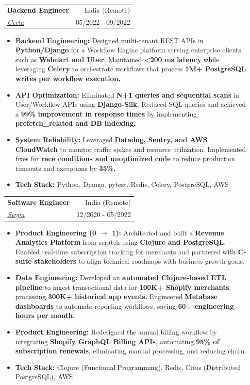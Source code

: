 \documentclass[letterpaper,11pt]{article}
\makeatletter
\newcommand{\resumeItem}[1]{
  \item\small{
    {#1 \vspace{-1pt}}
  }
}
\newcommand{\resumeSubheading}[4]{
  \vspace{-1pt}\item
    \begin{tabular*}{\textwidth}[t]{l@{\extracolsep{\fill}}r}
      \textbf{#1} & {\color{dark-grey}\small #2}\vspace{1pt}\\ %
      \textit{#3} & {\color{dark-grey} \small #4}\\ %
    \end{tabular*}\vspace{-4pt}
}
\newcommand{\resumeItemListStart}{\begin{itemize}}
\newcommand{\resumeItemListEnd}{\end{itemize}\vspace{0pt}}
\makeatother
\begin{document}
    \resumeSubheading
      {Backend Engineer}{India (Remote)}
      {\href{https://www.certa.ai/}{Certa}}{05/2022 - 09/2022}
      \resumeItemListStart
        \resumeItem{\textbf{Backend Engineering:} Designed multi-tenant REST APIs in \textbf{Python/Django} for a Workflow Engine platform serving enterprise clients such as \textbf{Walmart and Uber}. Maintained \textbf{<200 ms latency} while leveraging \textbf{Celery} to orchestrate workflows that process \textbf{1M+ PostgreSQL writes per workflow execution.}}
        \resumeItem{\textbf{API Optimization:} Eliminated \textbf{N+1 queries and sequential scans} in User/Workflow APIs using \textbf{Django-Silk}. Reduced SQL queries and achieved a \textbf{99\% improvement in response times} by implementing \textbf{prefetch\_related and DB indexing.}}
        \resumeItem{\textbf{System Reliability:} Leveraged \textbf{Datadog, Sentry, and AWS CloudWatch} to monitor traffic spikes and resource utilization. Implemented fixes for \textbf{race conditions and unoptimized code} to reduce production timeouts and exceptions by \textbf{35\%.}}
        \resumeItem{\textbf{Tech Stack:} Python, Django, pytest, Redis, Celery, PostgreSQL, AWS}
    \resumeItemListEnd

    \resumeSubheading
      {Software Engineer}{India (Remote)}
      {\href{https://www.getswym.com/}{Swym}}{12/2020 - 05/2022}
      \resumeItemListStart
        \resumeItem{\textbf{Product Engineering (0 $\rightarrow$ 1):} Architected and built a \textbf{Revenue Analytics Platform} from scratch using \textbf{Clojure and PostgreSQL}. Enabled real-time subscription tracking for merchants and partnered with \textbf{C-suite stakeholders} to align technical roadmaps with business growth goals.}
        \resumeItem{\textbf{Data Engineering:} Developed an \textbf{automated Clojure-based ETL pipeline} to ingest transactional data for \textbf{100K+ Shopify merchants}, processing \textbf{300K+ historical app events.} Engineered \textbf{Metabase dashboards} to automate reporting workflows, saving \textbf{60+ engineering hours per month.}}
        \resumeItem{\textbf{Product Engineering:} Redesigned the annual billing workflow by integrating \textbf{Shopify GraphQL Billing APIs}, automating \textbf{95\% of subscription renewals}, eliminating manual processing, and reducing churn.}
        \resumeItem{\textbf{Tech Stack:} Clojure (Functional Programming), Redis, Citus (Distributed PostgreSQL), AWS}
    \resumeItemListEnd
\end{document}
